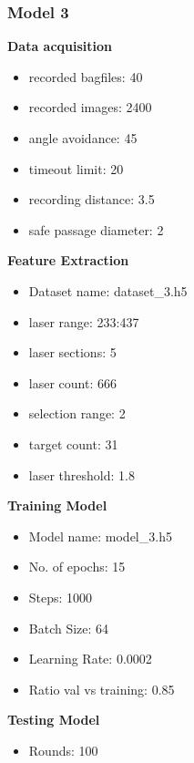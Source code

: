 \subsubsection{Model 3\label{model_3} }
\begin{multicols}{2}
\textbf{Data acquisition}
\begin{itemize}
\setlength\itemsep{0.1em}
\item recorded bagfiles: 40
\item recorded images: 2400
\item angle avoidance: 45
\item timeout limit: 20
\item recording distance: 3.5
\item safe passage diameter: 2
\end{itemize}

\textbf{Feature Extraction}
\begin{itemize}
\setlength\itemsep{0.1em}
\item Dataset name: dataset\_3.h5
\item  laser range: 233:437
\item  laser sections: 5
\item  laser count: 666
\item  selection range: 2
\item  target count: 31
\item  laser threshold: 1.8
\end{itemize}

\columnbreak

\textbf{Training Model}
\begin{itemize}
\setlength\itemsep{0.1em}
\item  Model name: model\_3.h5
\item  No. of epochs: 15
\item  Steps: 1000
\item  Batch Size: 64
\item  Learning Rate: 0.0002
\item  Ratio val vs training: 0.85
\end{itemize}

\textbf{Testing Model}
\begin{itemize}
\setlength\itemsep{0.1em}
\item Rounds: 100
\newline
\newline
\newline
\newline
\newline
\newline
\newline
\newline
\end{itemize}
\end{multicols}


